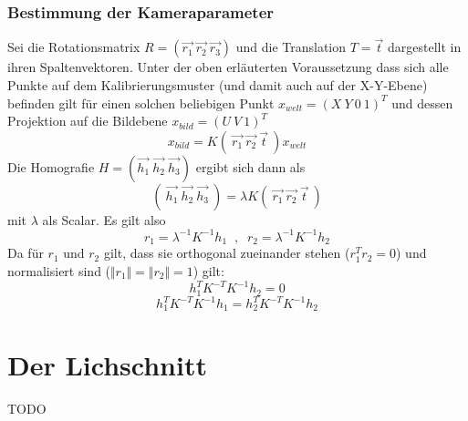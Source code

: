 \subsubsection{Bestimmung der Kameraparameter}
Sei die Rotationsmatrix \(R = \left(\vec{r_1}\:\vec{r_2}\:\vec{r_3}\right)\) und die Translation \(T = \vec{t}\) dargestellt in ihren Spaltenvektoren. Unter der oben erläuterten Voraussetzung dass sich alle Punkte auf dem Kalibrierungsmuster (und damit auch auf der X-Y-Ebene) befinden gilt für einen solchen beliebigen Punkt \(x_{welt} = (X\:Y\:0\:1)^{T}\) und dessen Projektion auf die Bildebene \(x_{bild} = (U\:V\:1)^{T}\)
\begin{equation}
	x_{bild} = K\left(\:\vec{r_1}\:\vec{r_2}\:\vec{t}\:\right)x_{welt}
\end{equation}
Die Homografie \(H = \left(\vec{h_1}\:\vec{h_2}\:\vec{h_3}\right)\) ergibt sich dann als
\begin{equation}
	\left(\:\vec{h_1}\:\vec{h_2}\:\vec{h_3}\:\right) = \lambda K\left(\:\vec{r_1}\:\vec{r_2}\:\vec{t}\:\right)
\end{equation}
mit \(\lambda\) als Scalar. Es gilt also
\begin{equation}
r_1 = \lambda^{-1} K^{-1} h_1 \;\;,\;\; r_2 = \lambda^{-1} K^{-1} h_2
\end{equation}
Da für \(r_1\) und \(r_2\) gilt, dass sie orthogonal zueinander stehen (\(r_1^Tr_2=0\)) und normalisiert sind (\(\Vert r_1 \Vert = \Vert r_2 \Vert = 1\)) gilt:
\begin{equation}
	h_1^{T} K^{-T} K^{-1} h_2 = 0
\end{equation}
\begin{equation}
	h_1^{T} K^{-T} K^{-1} h_1 = h_2^{T} K^{-T} K^{-1} h_2
\end{equation}
\section{Der Lichschnitt}
TODO